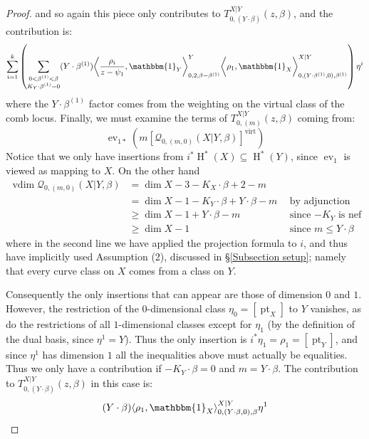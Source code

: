 \documentclass[11pt]{amsart}
\newcommand{\Q}[4]{\mathcal{Q}_{#1,#2}(#3,#4)}
\newcommand{\virt}[1]{[#1]^{\operatorname{virt}}}
\newcommand{\HH}{\operatorname{H}}
\newcommand{\pt}{\operatorname{pt}}
\newcommand{\ev}{\operatorname{ev}}
\newcommand{\vdim}{\operatorname{vdim}}
\theoremstyle{definition}
\theoremstyle{definition}
\begin{document}
\begin{proof}
and so again this piece only contributes to $T_{0,(Y\cdot\beta)}^{X|Y}(z,\beta)$, and the contribution is:
\begin{equation*} \sum_{i=1}^k \left( \sum_{\substack{0 < \beta^{(1)} < \beta \\ K_Y \cdot \beta^{(1)}=0}} (Y \cdot \beta^{(1)}) \bigg\langle \dfrac{\rho_i}{z-\psi_1}, \mathbbm{1}_Y \bigg\rangle_{0,2,\beta-\beta^{(1)}}^Y \bigg\langle \rho_1, \mathbbm{1}_X \bigg\rangle_{0,(Y \cdot \beta^{(1)},0),\beta^{(1)}}^{X|Y} \right) \eta^i \end{equation*}
where the $Y \cdot \beta^{(1)}$ factor comes from the weighting on the virtual class of the comb locus. Finally, we must examine the terms of $T_{0,(m)}^{X|Y}(z,\beta)$ coming from:
\begin{equation*}\ev_{1*}(m\virt{\Q{0}{(m,0)}{X|Y}{\beta}})\end{equation*} 
Notice that we only have insertions from $i^*\HH^*(X) \subseteq \HH^*(Y)$, since $\ev_1$ is viewed as mapping to $X$. On the other hand
\begin{align*} \vdim \Q{0}{(m,0)}{X|Y}{\beta} & = \dim X-3 -K_X \cdot \beta +2-m & \\
& = \dim X - 1 -K_Y \cdot \beta + Y \cdot \beta - m \ \ & \text{by adjunction} \\
& \geq \dim X - 1 + Y\cdot\beta - m \ \ & \text{since $-K_Y$ is nef} \\
& \geq \dim X - 1 \ \ & \text{since $m \leq Y \cdot \beta$} \end{align*}
where in the second line we have applied the projection formula to $i$, and thus have implicitly used Assumption (2), discussed in \S \ref{Subsection setup}; namely that every curve class on $X$ comes from a class on $Y$.

Consequently the only insertions that can appear are those of dimension $0$ and $1$. However, the restriction of the $0$-dimensional class $\eta_0 = [\pt_X]$ to $Y$ vanishes, as do the restrictions of all $1$-dimensional classes except for $\eta_1$ (by the definition of the dual basis, since $\eta^1 = Y$). Thus the only insertion is $i^*\eta_1=\rho_1=[\pt_Y]$, and since $\eta^1$ has dimension $1$ all the inequalities above must actually be equalities. Thus we only have a contribution if $-K_Y \cdot \beta = 0$ and $m = Y \cdot \beta$. The contribution to $T_{0,(Y\cdot\beta)}^{X|Y}(z,\beta)$ in this case is:
\begin{equation*} (Y \cdot \beta) \langle \rho_1 , \mathbbm{1}_X \rangle_{0,(Y \cdot \beta,0),\beta}^{X|Y} \eta^1 \end{equation*}


\end{proof}
\end{document}
